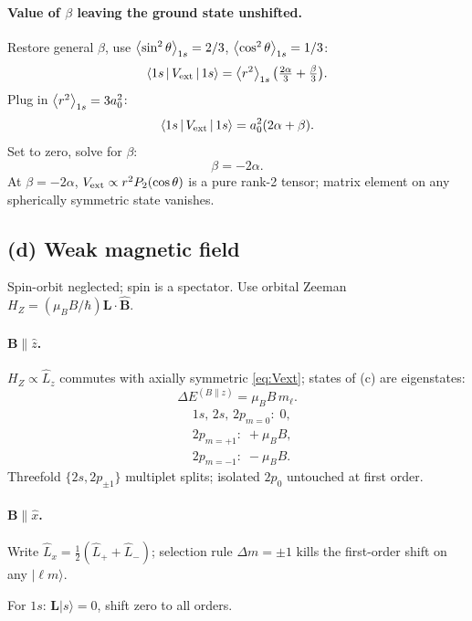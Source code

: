 \documentclass[11pt]{article}
\begin{document}
\paragraph{Value of $\beta$ leaving the ground state unshifted.}

Restore general $\beta$, use $\Braket{\sin^2\theta}_{1s}=2/3$, $\Braket{\cos^2\theta}_{1s}=1/3$:
\[
\Braket{1s|V_{\rm ext}|1s}=\Braket{r^2}_{1s}\bigl(\tfrac{2\alpha}{3}+\tfrac{\beta}{3}\bigr).
\]
Plug in $\Braket{r^2}_{1s}=3a_0^2$:
\[
\Braket{1s|V_{\rm ext}|1s}=a_0^2(2\alpha+\beta).
\]
Set to zero, solve for $\beta$:
\begin{equation}
\boxed{\;\beta=-2\alpha.\;}
\label{eq:beta-zero}
\end{equation}
At $\beta=-2\alpha$, $V_{\rm ext}\propto r^2 P_2(\cos\theta)$ is a pure rank-2 tensor; matrix element on any spherically symmetric state vanishes.

\subsection*{(d) Weak magnetic field}

Spin-orbit neglected; spin is a spectator. Use orbital Zeeman $H_Z=(\mu_B B/\hbar)\bm L\cdot\hat{\bm B}$.

\paragraph{$\bm B\parallel\hat z$.} $H_Z\propto\hat L_z$ commutes with axially symmetric \eqref{eq:Vext}; states of (c) are eigenstates:
\[
\Delta E^{(B\|z)}=\mu_B B\,m_\ell.
\]
\begin{equation}
\boxed{\;
\begin{aligned}
&1s,\,2s,\,2p_{m=0}:\;0,\\
&2p_{m=+1}:\;+\mu_B B,\\
&2p_{m=-1}:\;-\mu_B B.
\end{aligned}\;}
\label{eq:Bz}
\end{equation}
Threefold $\{2s,2p_{\pm 1}\}$ multiplet splits; isolated $2p_0$ untouched at first order.

\paragraph{$\bm B\parallel\hat x$.} Write $\hat L_x=\tfrac12(\hat L_++\hat L_-)$; selection rule $\Delta m=\pm 1$ kills the first-order shift on any $|\ell m\rangle$.

For $1s$: $\bm L|s\rangle=0$, shift zero to all orders.
\end{document}
